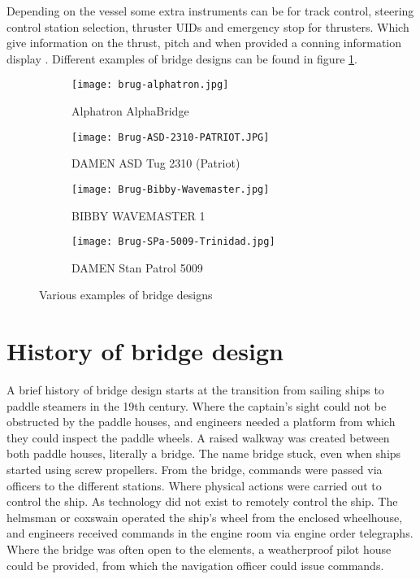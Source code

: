 Depending on the vessel some extra instruments can be for track control, steering control station selection, thruster \ac{UID}s and emergency stop for thrusters. Which give information on the thrust, pitch and when provided a conning information display  \cite{DNVGL2017}. Different examples of bridge designs can be found in figure \ref{fig:bridge-example}.

\begin{figure}[H]
	\centering
	
	\begin{subfigure}[b]{0.45\textwidth}
		\texttt{[image: brug-alphatron.jpg]}
		\caption{Alphatron AlphaBridge}
	\end{subfigure}
	\hfill
	\begin{subfigure}[b]{0.45\textwidth}
		\texttt{[image: Brug-ASD-2310-PATRIOT.JPG]}
		\caption{DAMEN ASD Tug 2310 (Patriot)}
	\end{subfigure}
	\hfill
	\begin{subfigure}[b]{0.45\textwidth}
		\texttt{[image: Brug-Bibby-Wavemaster.jpg]}
		\caption{BIBBY WAVEMASTER 1}
	\end{subfigure}
	\hfill
	\begin{subfigure}[b]{0.45\textwidth}
		\texttt{[image: Brug-SPa-5009-Trinidad.jpg]}
		\caption{DAMEN Stan Patrol 5009}
	\end{subfigure}	
	
	\caption{Various examples of bridge designs}
	\label{fig:bridge-example}
	
\end{figure}

\section{History of bridge design}
A brief history of bridge design starts at the transition from sailing ships to paddle steamers in the 19th century. Where the captain's sight could not be obstructed by the paddle houses, and engineers needed a platform from which they could inspect the paddle wheels. A raised walkway was created between both paddle houses, literally a bridge. The name bridge stuck, even when ships started using screw propellers. From the bridge, commands were passed via officers to the different stations. Where physical actions were carried out to control the ship. As technology did not exist to remotely control the ship. The helmsman or coxswain operated the ship's wheel from the enclosed wheelhouse, and engineers received commands in the engine room via engine order telegraphs. Where the bridge was often open to the elements, a weatherproof pilot house could be provided, from which the navigation officer could issue commands.

